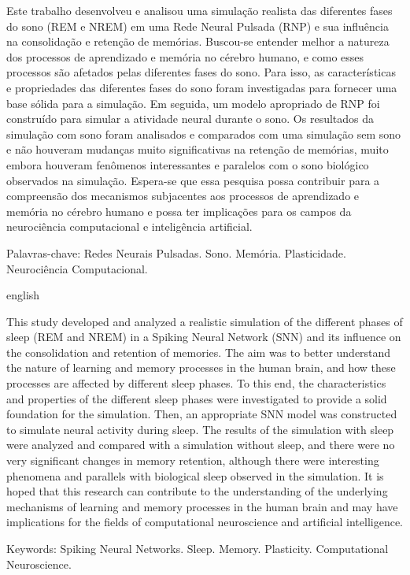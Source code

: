 \begin{resumo}
\noindent
 
Este trabalho desenvolveu e analisou uma simulação realista das diferentes fases do sono (REM e NREM) em uma Rede Neural Pulsada
(RNP) e sua influência na consolidação e retenção de memórias. Buscou-se entender melhor a natureza dos processos de aprendizado e
memória no cérebro humano, e como esses processos são afetados pelas diferentes fases do sono. Para isso, as características e
propriedades das diferentes fases do sono foram investigadas para fornecer uma base sólida para a simulação. Em seguida, um modelo
apropriado de RNP foi construído para simular a atividade neural durante o sono. Os resultados da simulação com sono foram
analisados e comparados com uma simulação sem sono e não houveram mudanças muito significativas na retenção de memórias, muito
embora houveram fenômenos interessantes e paralelos com o sono biológico observados na simulação. Espera-se que essa pesquisa
possa contribuir para a compreensão dos mecanismos subjacentes aos processos de aprendizado e memória no cérebro humano e possa
ter implicações para os campos da neurociência computacional e inteligência artificial.

\vspace{0.2cm}   
Palavras-chave: Redes Neurais Pulsadas. Sono. Memória. Plasticidade. Neurociência Computacional. 
\end{resumo}
 
\begin{resumo}[Abstract]	
\begin{otherlanguage*}{english}
\noindent 
 
This study developed and analyzed a realistic simulation of the different phases of sleep (REM and NREM) in a Spiking Neural
Network (SNN) and its influence on the consolidation and retention of memories. The aim was to better understand the nature of
learning and memory processes in the human brain, and how these processes are affected by different sleep phases. To this end, the
characteristics and properties of the different sleep phases were investigated to provide a solid foundation for the simulation.
Then, an appropriate SNN model was constructed to simulate neural activity during sleep. The results of the simulation with sleep
were analyzed and compared with a simulation without sleep, and there were no very significant changes in memory retention,
although there were interesting phenomena and parallels with biological sleep observed in the simulation. It is hoped that this
research can contribute to the understanding of the underlying mechanisms of learning and memory processes in the human brain and
may have implications for the fields of computational neuroscience and artificial intelligence.

\vspace{0.2cm}
Keywords: Spiking Neural Networks. Sleep. Memory. Plasticity. Computational Neuroscience.
\end{otherlanguage*}
\end{resumo}
